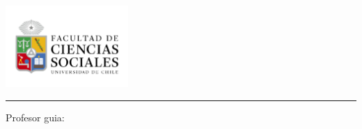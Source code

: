 \makeatletter
\providecommand{\subtitle}[1]{\gdef\@subtitle{#1}}
\providecommand{\@subtitle}{}
\providecommand{\frontmattercontext}{}
\providecommand{\advisorname}{}
\providecommand{\advisorlabel}{Profesor guia:}
\providecommand{\frontmatterlocation}{}

\newcommand{\PrintTitle}{%
  {\sffamily\bfseries\fontsize{24pt}{28pt}\selectfont \@title\par}%
}
\newcommand{\PrintSubtitle}{%
  \begingroup
  \edef\temp{\detokenize{\@subtitle}}%
  \ifx\temp\empty\relax
  \else
    {\sffamily\bfseries\large \@subtitle\par}%
  \fi
  \endgroup
}
\newcommand{\PrintAuthor}{%
  {\Large\bfseries \@author\par}%
}
\newcommand{\PrintDate}{%
  {\small \@date\par}%
}
\makeatother

\begin{titlepage}
\thispagestyle{empty}
\begin{center}
\vspace*{10mm}

\includegraphics[width=0.35\textwidth]{assets/cover.png}\par
\vspace{12mm}

\PrintTitle
\vspace{6mm}
\PrintSubtitle

\vspace{22mm}
\begingroup
\edef\temp{\detokenize{\frontmattercontext}}%
\ifx\temp\empty\relax
\else
  {\normalsize \frontmattercontext\par}
\fi
\endgroup

\vspace{18mm}
\PrintAuthor

\vspace{16mm}
\begingroup
\edef\temp{\detokenize{\advisorname}}%
\ifx\temp\empty\relax
\else
  \rule{0.45\textwidth}{0.4pt}\par
  {\small \advisorlabel\ \advisorname\par}
\fi
\endgroup

\vfill
\begingroup
\edef\temp{\detokenize{\frontmatterlocation}}%
\ifx\temp\empty\relax
\else
  {\small \frontmatterlocation\par}
\fi
\endgroup
\PrintDate

\end{center}
\end{titlepage}

\frontmatter
\pagestyle{plain}

\setcounter{tocdepth}{2} %
